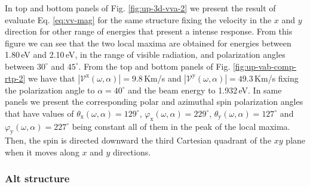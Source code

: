 \documentclass[prb,11pt,tightenlines,twocolumn,aps]{revtex4-1}
\begin{document}
In top and bottom panels of Fig. \ref{fig:up-3d-vva-2} we present the
result of evaluate Eq. \eqref{eq:vv-mag} for the same structure fixing the
velocity in the $x$ and $y$ direction for other range of energies that present
a intense response.
% 
From this figure we can see that the two local maxima are obtained for energies
between 1.80\,eV and 2.10\,eV, in the range of visible radiation, and
polarization angles between $30^ {\circ}$ and $45^{\circ}$.
% 
From the top and bottom panels of Fig. \ref{fig:up-vab-comp-rtp-2} we have that
$|\mathcal{V}^{\mathrm{x}} (\omega,\alpha)| =  9.8$\,Km/s and
$|\mathcal{V}^{\mathrm{y}} (\omega,\alpha)| = 49.3$\,Km/s fixing the
polarization angle to $\alpha=40^{\circ}$ and the beam energy to 1.932\,eV.
% 
In same panels we present the corresponding polar and azimuthal spin
polarization angles that have values of $\theta_{\mathrm{x}}(\omega,\alpha) =
129^{\circ}$, $\varphi_{\mathrm{x}}(\omega,\alpha) = 229^{\circ}$,
$\theta_{\mathrm{y}} (\omega,\alpha) = 127^{\circ}$ and $\varphi_{\mathrm{y}}
(\omega,\alpha) = 227^{\circ}$ being constant all of them in the peak of the
local maxima. Then, the spin is directed downward the third Cartesian quadrant
of the $xy$ plane when it moves along $x$ and $y$ directions.


\subsubsection{Alt structure}
\end{document}
